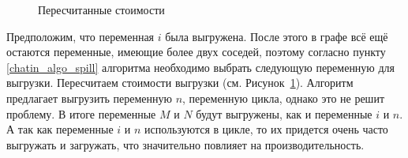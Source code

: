 \begin{figure}[H]
    \centering
    \caption{Пересчитанные стоимости}
    \label{fig:chatin_problem_2}
\end{figure}

Предположим, что переменная $i$ была выгружена.
После этого в графе всё ещё остаются переменные, имеющие более двух соседей,
поэтому согласно пункту \ref{chatin_algo_spill} алгоритма необходимо выбрать следующую переменную для выгрузки.
Пересчитаем стоимости выгрузки (см. Рисунок~\ref{fig:chatin_problem_2}).
Алгоритм предлагает выгрузить переменную $n$, переменную цикла, однако это не решит проблему.
В итоге переменные $M$ и $N$ будут выгружены, как и переменные $i$ и $n$.
А так как переменные $i$ и $n$ используются в цикле, то их придется очень часто выгружать и загружать, что
значительно повлияет на производительность.
